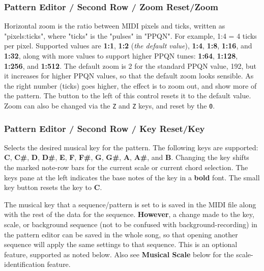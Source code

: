 \subsubsection{Pattern Editor / Second Row / Zoom Reset/Zoom}
\label{subsubsec:pattern_editor_second_row_zoom_reset}

   Horizontal zoom is the ratio between MIDI pixels and ticks, written as
   "pixels:ticks", where "ticks" is the "pulses" in "PPQN".
   For example, 1:4 = 4 ticks per pixel.
   Supported values are
   \textbf{1:1}, \textbf{1:2} (\textsl{the default value}),
   \textbf{1:4}, \textbf{1:8}, \textbf{1:16},
   and \textbf{1:32}, along with
   more values to support higher PPQN tunes:
   \textbf{1:64}, \textbf{1:128}, \textbf{1:256}, and \textbf{1:512}.
   The default zoom is 2 for the standard PPQN value, 192, but it
   increases for higher PPQN values, so that the default zoom looks sensible.
   As the right number (ticks) goes higher,
   the effect is to zoom out, and show more of the pattern.
   The button to the left of this control resets it to the default value.
   Zoom can also be changed via the \texttt{Z} and \texttt{Z} keys, and
   reset by the \texttt{0}.

\subsubsection{Pattern Editor / Second Row / Key Reset/Key}
\label{subsubsec:pattern_editor_second_row_musical_key}

   Selects the desired musical key for the pattern.  The following keys are
   supported:
   \textbf{C}, \textbf{C\#},
   \textbf{D}, \textbf{D\#},
   \textbf{E}, \textbf{F}, \textbf{F\#},
   \textbf{G}, \textbf{G\#},
   \textbf{A}, \textbf{A\#},
   and \textbf{B}.
   Changing the key
   shifts the marked note-row bars for the current scale or current
   chord selection.
   The keys pane at the left indicates the base notes
   of the key in a \textbf{bold} font.
   The small key button resets the key to \textbf{C}.

   The musical key that a sequence/pattern is set to is
   saved in the MIDI file along with the rest of the data for the sequence.
   \textbf{However},
   a change made to the key, scale,
   or background sequence (not to be confused with background-recording)
   in the pattern editor can be saved in the whole song,
   so that opening another sequence
   will apply the same settings to that sequence.  This is an optional feature,
   supported as noted below.
   Also see \textbf{Musical Scale} below for the scale-identification feature.

